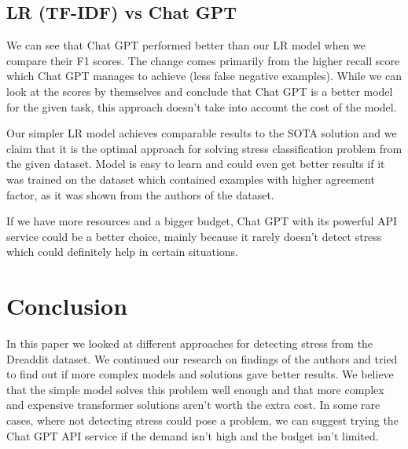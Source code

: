 \documentclass[10pt, a4paper]{article}
\begin{document}
\subsection{LR (TF-IDF) vs Chat GPT}
We can see that Chat GPT performed better than our LR model when we compare their F1 scores.
The change comes primarily from the higher recall score which Chat GPT manages to achieve (less false negative examples).
While we can look at the scores by themselves and conclude that Chat GPT is a better model for the given task, this approach doesn't take into account the cost of the model.

Our simpler LR model achieves comparable results to the SOTA solution and we claim that it is the optimal approach for solving stress classification problem from the given dataset.
Model is easy to learn and could even get better results if it was trained on the dataset which contained examples with higher agreement factor, as it was shown from the authors of the dataset.

If we have more resources and a bigger budget, Chat GPT with its powerful API service could be a better choice, mainly because it rarely doesn't detect stress which could definitely help in certain situations.
\section{Conclusion}

In this paper we looked at different approaches for detecting stress from the Dreaddit dataset.
We continued our research on findings of the authors and tried to find out if more complex models and solutions gave better results.
\hfill \break
\hfill \break
We believe that the simple model solves this problem well enough and that more complex and expensive transformer solutions aren't worth the extra cost.
In some rare cases, where not detecting stress could pose a problem, we can suggest trying the Chat GPT API service if the demand isn't high and the budget isn't limited.



\end{document}
